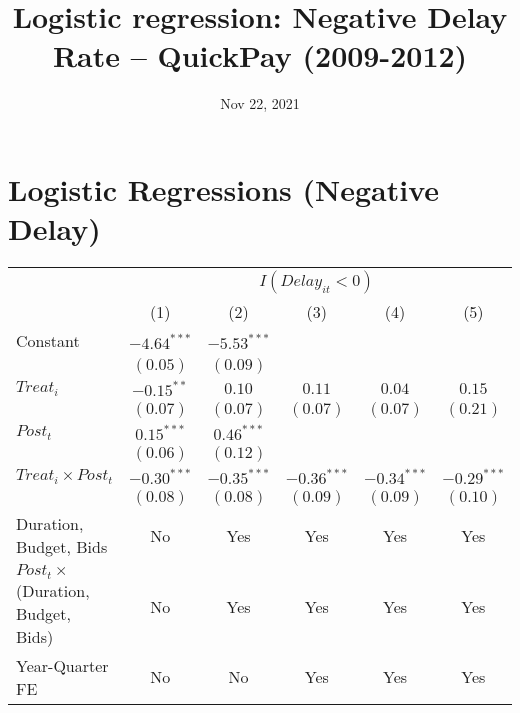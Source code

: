 \documentclass[
]{article}
\title{Logistic regression: Negative Delay Rate -- QuickPay (2009-2012)}
\author{}
\date{\vspace{-2.5em}Nov 22, 2021}
\begin{document}
\maketitle

\hypertarget{logistic-regressions-negative-delay}{%
\section{Logistic Regressions (Negative
Delay)}\label{logistic-regressions-negative-delay}}

\begin{table}
\begin{center}
\begin{tabular}{l c c c c c}
\hline
 & \multicolumn{5}{c}{$I(Delay_{it}<0)$} \\
\cline{2-6}
 & (1) & (2) & (3) & (4) & (5) \\
\hline
Constant                                   & $-4.64^{***}$ & $-5.53^{***}$ &               &               &               \\
                                           & $(0.05)$      & $(0.09)$      &               &               &               \\
$Treat_i$                                  & $-0.15^{**}$  & $0.10$        & $0.11$        & $0.04$        & $0.15$        \\
                                           & $(0.07)$      & $(0.07)$      & $(0.07)$      & $(0.07)$      & $(0.21)$      \\
$Post_t$                                   & $0.15^{***}$  & $0.46^{***}$  &               &               &               \\
                                           & $(0.06)$      & $(0.12)$      &               &               &               \\
$Treat_i \times Post_t$                    & $-0.30^{***}$ & $-0.35^{***}$ & $-0.36^{***}$ & $-0.34^{***}$ & $-0.29^{***}$ \\
                                           & $(0.08)$      & $(0.08)$      & $(0.09)$      & $(0.09)$      & $(0.10)$      \\
\hline
Duration, Budget, Bids                     & No            & Yes           & Yes           & Yes           & Yes           \\
$Post_t \times $  (Duration, Budget, Bids) & No            & Yes           & Yes           & Yes           & Yes           \\
Year-Quarter FE                            & No            & No            & Yes           & Yes           & Yes           \\

\end{tabular}
\end{center}
\end{table}
\end{document}
